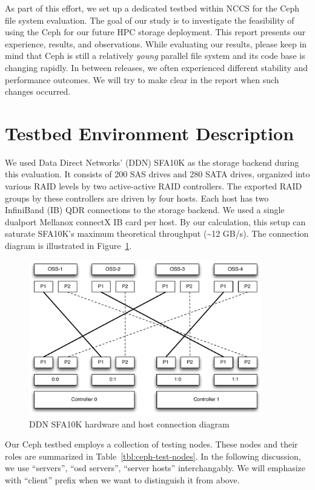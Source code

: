\documentclass{article}
\begin{document}
As part of this effort, we set up a dedicated testbed within NCCS for the Ceph
file system evaluation. The goal of our study is to investigate the
feasibility of using the Ceph for our future HPC storage deployment.  This
report presents our experience, results, and observations. While evaluating
our results, please keep in mind that Ceph is still a relatively
\textit{young} parallel file system and its code base is changing rapidly. In
between releases, we often experienced different stability and performance
outcomes.  We will try to make clear in the report when such changes occurred.

\section{Testbed Environment Description}

We used Data Direct Networks' (DDN) SFA10K as the storage backend during this
evaluation. It consists of 200 SAS drives and 280 SATA drives, organized into
various RAID levels by two active-active RAID controllers. The exported RAID
groups by these controllers are driven by four hosts.
Each host has two InfiniBand (IB) QDR connections to the storage backend.
We used a single dualport Mellanox connectX IB card per host.
By our calculation, this setup can saturate SFA10K's maximum theoretical
throughput (\textasciitilde 12 GB/s). The connection diagram is illustrated in
Figure~\ref{fig:ddn-sfa10k}.

\begin{figure}[htb]
\centering
\includegraphics[width=4in]{figs/sfa10k}
\caption{DDN SFA10K hardware and host connection diagram}
\label{fig:ddn-sfa10k}
\end{figure}


Our Ceph testbed employs a collection of testing nodes. These nodes and their
roles are summarized in Table~\ref{tbl:ceph-test-nodes}. In the following
discussion, we use ``servers'', ``osd servers'', ``server hosts''
interchangably. We will emphasize with ``client'' prefix when we want to
distinguish it from above.
\end{document}
